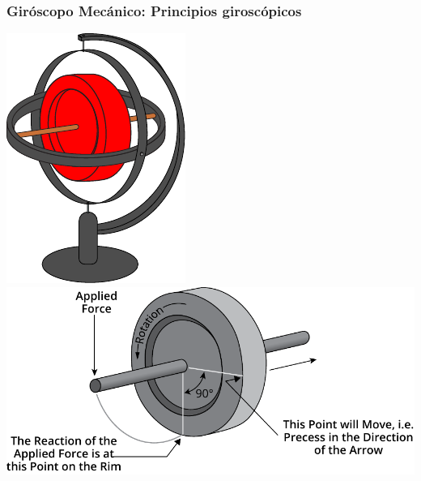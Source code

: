 \begin{frame}
    \frametitle{Giróscopo Mecánico: Principios giroscópicos}
    \scriptsize
    
    \begin{center}
        \hspace{1em}
        \includegraphics[width=0.15\columnwidth]{images/gyroscope.pdf}
        \hspace{1em}
        \includegraphics[width=0.4\columnwidth]{images/gyroscope_precession.pdf}
    \end{center}


\end{frame}
